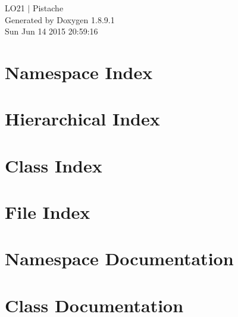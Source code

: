 \documentclass[twoside]{book}
\newcommand{\+}{\discretionary{\mbox{\scriptsize$\hookleftarrow$}}{}{}}
\newcommand{\clearemptydoublepage}{%
  \newpage{\pagestyle{empty}\cleardoublepage}%
}
\begin{document}
\hypersetup{pageanchor=false,
             bookmarks=true,
             bookmarksnumbered=true,
             pdfencoding=unicode
            }
\begin{titlepage}
\vspace*{7cm}
\begin{center}%
{\Large L\+O21 $\vert$ Pistache }\\
\vspace*{1cm}
{\large Generated by Doxygen 1.8.9.1}\\
\vspace*{0.5cm}
{\small Sun Jun 14 2015 20:59:16}\\
\end{center}
\end{titlepage}
\clearemptydoublepage
\tableofcontents
\clearemptydoublepage
{}
\hypersetup{pageanchor=true}

\chapter{Namespace Index}

\chapter{Hierarchical Index}

\chapter{Class Index}

\chapter{File Index}

\chapter{Namespace Documentation}


\chapter{Class Documentation}

































\end{document}

